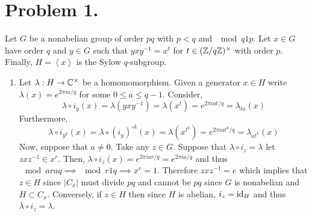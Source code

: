 \documentclass[12pt]{extarticle}
\begin{document}

\section*{Problem 1.}
Let $G$ be a nonabelian group of order $pq$ with $p < q$ and $\mod{q}{1}{p}$. Let $x \in G$ have order $q$ and $y \in G$ such that $y x y^{-1} = x^t$ for $t \in (\mathbb{Z} / q \mathbb{Z})^\times$ with order $p$. Finally, $H = \left< x \right>$ is the Sylow $q$-subgroup. 
\begin{enumerate}
\item Let $\lambda : H \to \mathbb{C}^\times$ be a homomomorphism. Given a generator $x \in H$ write $\lambda(x) = e^{2 \pi i a / q}$ for some $0 \le a \le q-1$. Consider, 
\[ \lambda \circ i_y(x) = \lambda(y x y^{-1}) = \lambda(x^{t}) = e^{2 \pi i a t / q} = \lambda_{ta}(x) \]
Furthermore,
\[ \lambda \circ i_{y^k}(x) = \lambda \circ (i_y)^{\circ k}(x) = \lambda(x^{t^k}) = e^{2 \pi i a t^k / q} = \lambda_{a t^k}(x) \]
Now, suppose that $a \neq 0$. Take any $z \in G$. Suppose that $\lambda \circ i_z = \lambda$ let $z x z^{-1} \in x^r$. Then, $\lambda \circ i_z(x) = e^{2 \pi i a r / q} = e^{2 \pi i a / q}$ and thus $\mod{ar}{a}{q} \implies \mod{r}{1}{q} \implies x^r = 1$. Therefore $z x z^{-1} = e$ which implies that $z \in H$ since $|C_x|$ must divide $pq$ and cannot be $pq$ since $G$ is nonabelian and $H \subset C_x$. Conversely, if $z \in H$ then since $H$ is abelian, $i_z = \mathrm{id}_{H}$ and thus $\lambda \circ i_z = \lambda$. 


\end{enumerate}
\end{document}
